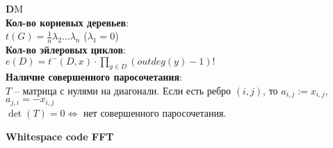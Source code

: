 \documentclass[a4paper,10pt, twocolumn]{article}
\begin{document}
\pagebreak

\inputminted[linenos, breaklines]{c++}{code/sk.cpp}
\inputminted[linenos, breaklines]{c++}{code/euclid.cpp}
\inputminted[linenos, breaklines]{c++}{code/fft.cpp}
\inputminted[linenos, breaklines]{c++}{code/gauss.cpp}
\inputminted[linenos, breaklines]{c++}{code/geometry.h}
\inputminted[linenos, breaklines]{c++}{code/convex_hull.h}
\inputminted[linenos, breaklines]{c++}{code/convex_hull_trick.cpp}
\inputminted[linenos, breaklines]{c++}{code/hld.cpp}
\inputminted[linenos, breaklines]{c++}{code/max_flow.cpp}
\inputminted[linenos, breaklines]{c++}{code/min_cost.cpp}
\inputminted[linenos, breaklines]{c++}{code/hungarian.cpp}
\inputminted[linenos, breaklines]{c++}{code/edmonds.cpp}
\inputminted[linenos, breaklines]{c++}{code/strings.cpp}
\inputminted[linenos, breaklines]{c++}{code/min_cyclic_shift.cpp}
\inputminted[linenos, breaklines]{c++}{code/suffmas.cpp}
\inputminted[linenos, breaklines]{c++}{code/automaton.cpp}
\inputminted[linenos, breaklines]{c++}{code/pollard.cpp}
\inputminted[linenos, breaklines]{c++}{code/sieve.cpp}
\inputminted[linenos, breaklines]{c++}{code/discrete_log.cpp}
\inputminted[linenos, breaklines]{c++}{code/prime_roots.cpp}
\inputminted[linenos, breaklines]{c++}{code/simplex.cpp}
\inputminted[linenos, breaklines]{c++}{code/sum_over_subsets.cpp}
\inputminted[linenos, breaklines]{c++}{code/algebra}
\inputminted[linenos, breaklines]{c++}{code/wavelet_tree.cpp}
\inputminted[linenos, breaklines]{c++}{code/berlecamp-massey.cpp}
\inputminted[linenos, breaklines]{c++}{code/fft_and_ds.cpp}
\inputminted[linenos, breaklines]{c++}{code/2chinese.cpp}
\inputminted[linenos, breaklines]{c++}{code/min_circulation.cpp}
\inputminted[linenos, breaklines]{c++}{code/hashtable.cpp}
\pagebreak
{\textbf DM}\\

{\bf Кол-во корневых деревьев}:\\
$t(G)=\frac 1 n \lambda_2 \ldots \lambda_n$ ($\lambda_1=0$)\\

{\bf Кол-во эйлеровых циклов}:\\
$e(D)=t^-(D,x) \cdot \prod\limits_{y\in D} (outdeg(y)-1)!$\\

{\bf Наличие совершенного паросочетания}:\\
$T$ -- матрица с нулями на диагонали. Если есть ребро $(i, j)$, то $a_{i,j}:=x_{i,j}$, $a_{j,i}=-x_{i,j}$\\
$\det(T)=0 \Leftrightarrow$ нет совершенного паросочетания.
\pagebreak

{\bf \Large Whitespace code FFT} \pagebreak
\end{document}
